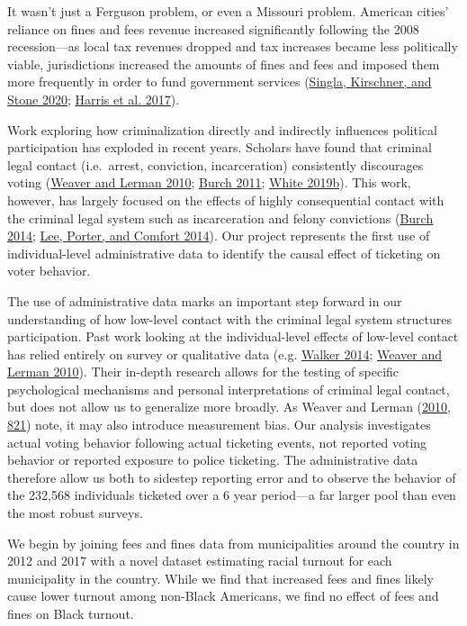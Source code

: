 \documentclass[
  12pt,
]{article}
\begin{document}
It wasn't just a Ferguson problem, or even a Missouri problem. American cities' reliance on fines and fees revenue increased significantly following the 2008 recession---as local tax revenues dropped and tax increases became less politically viable, jurisdictions increased the amounts of fines and fees and imposed them more frequently in order to fund government services (\protect\hyperlink{ref-Singla2020}{Singla, Kirschner, and Stone 2020}; \protect\hyperlink{ref-Harris2017}{Harris et al. 2017}).

Work exploring how criminalization directly and indirectly influences political participation has exploded in recent years. Scholars have found that criminal legal contact (i.e.~arrest, conviction, incarceration) consistently discourages voting (\protect\hyperlink{ref-Weaver2010}{Weaver and Lerman 2010}; \protect\hyperlink{ref-Burch2011}{Burch 2011}; \protect\hyperlink{ref-White2019a}{White 2019b}). This work, however, has largely focused on the effects of highly consequential contact with the criminal legal system such as incarceration and felony convictions (\protect\hyperlink{ref-Burch2014}{Burch 2014}; \protect\hyperlink{ref-Lee2014}{Lee, Porter, and Comfort 2014}). Our project represents the first use of individual-level administrative data to identify the causal effect of ticketing on voter behavior.

The use of administrative data marks an important step forward in our understanding of how low-level contact with the criminal legal system structures participation. Past work looking at the individual-level effects of low-level contact has relied entirely on survey or qualitative data (e.g. \protect\hyperlink{ref-Walker2014}{Walker 2014}; \protect\hyperlink{ref-Weaver2010}{Weaver and Lerman 2010}). Their in-depth research allows for the testing of specific psychological mechanisms and personal interpretations of criminal legal contact, but does not allow us to generalize more broadly. As Weaver and Lerman (\protect\hyperlink{ref-Weaver2010}{2010, 821}) note, it may also introduce measurement bias. Our analysis investigates actual voting behavior following actual ticketing events, not reported voting behavior or reported exposure to police ticketing. The administrative data therefore allow us both to sidestep reporting error and to observe the behavior of the 232,568 individuals ticketed over a 6 year period---a far larger pool than even the most robust surveys.

We begin by joining fees and fines data from municipalities around the country in 2012 and 2017 with a novel dataset estimating racial turnout for each municipality in the country. While we find that increased fees and fines likely cause lower turnout among non-Black Americans, we find no effect of fees and fines on Black turnout.
\end{document}
